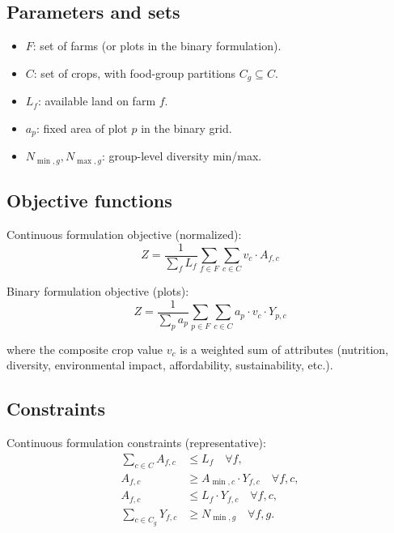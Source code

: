 \documentclass[11pt,a4paper]{article}
\begin{document}
\subsection{Parameters and sets}
\begin{itemize}
    \item $F$: set of farms (or plots in the binary formulation).
    \item $C$: set of crops, with food-group partitions $C_g\subseteq C$.
    \item $L_f$: available land on farm $f$.
    \item $a_p$: fixed area of plot $p$ in the binary grid.
    \item $N_{\min,g}, N_{\max,g}$: group-level diversity min/max.
\end{itemize}

\subsection{Objective functions}

Continuous formulation objective (normalized):
\begin{equation}
Z = \frac{1}{\sum_{f} L_f} \sum_{f \in F} \sum_{c \in C} v_c \cdot A_{f,c}
\end{equation}

Binary formulation objective (plots):
\begin{equation}
Z = \frac{1}{\sum_{p} a_p} \sum_{p \in F} \sum_{c \in C} a_p \cdot v_c \cdot Y_{p,c}
\end{equation}

where the composite crop value $v_c$ is a weighted sum of attributes (nutrition, diversity, environmental impact, affordability, sustainability, etc.).

\subsection{Constraints}

Continuous formulation constraints (representative):
\begin{align}
\sum_{c \in C} A_{f,c} &\le L_f \quad \forall f, \\
A_{f,c} &\ge A_{\min,c} \cdot Y_{f,c} \quad \forall f,c, \\
A_{f,c} &\le L_f \cdot Y_{f,c} \quad \forall f,c, \\
\sum_{c \in C_g} Y_{f,c} &\ge N_{\min,g} \quad \forall f,g.
\end{align}
\end{document}
